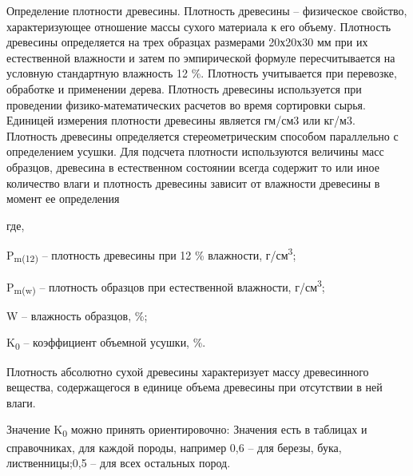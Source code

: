 Определение плотности древесины. Плотность древесины -- физическое
свойство, характеризующее отношение массы сухого материала к его объему.
Плотность древесины определяется на трех образцах размерами 20х20х30 мм
при их естественной влажности и затем по эмпирической формуле
пересчитывается на условную стандартную влажность 12 \%. Плотность
учитывается при перевозке, обработке и применении дерева. Плотность
древесины используется при проведении физико-математических расчетов во
время сортировки сырья. Единицей измерения плотности древесины является
гм/см3 или кг/м3. Плотность древесины определяется стереометрическим
способом параллельно с определением усушки. Для подсчета плотности
используются величины масс образцов, древесина в естественном состоянии
всегда содержит то или иное количество влаги и плотность древесины
зависит от влажности древесины в момент ее определения


где,

P\textsubscript{m(12)} -- плотность древесины при 12 \% влажности,
г/см\textsuperscript{3};

P\textsubscript{m(w)} -- плотность образцов при естественной влажности,
г/см\textsuperscript{3};

W -- влажность образцов, \%;

K\textsubscript{0} -- коэффициент объемной усушки, \%.

Плотность абсолютно сухой древесины характеризует массу древесинного
вещества, содержащегося в единице объема древесины при отсутствии в ней
влаги.

Значение K\textsubscript{0} можно принять ориентировочно: Значения есть
в таблицах и справочниках, для каждой породы, например 0,6 -- для
березы, бука, лиственницы;0,5 -- для всех остальных пород.

